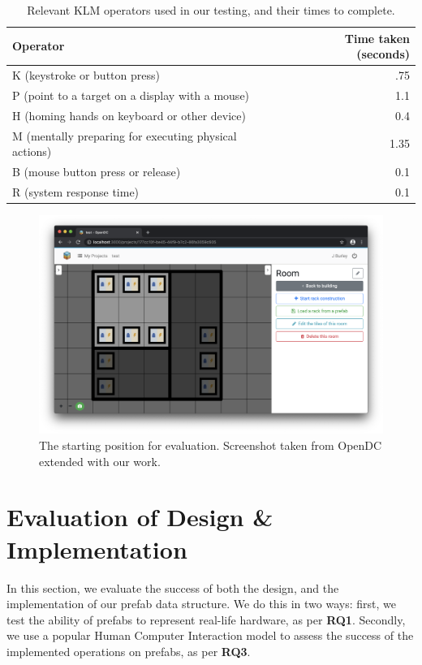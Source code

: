 \documentclass[11pt]{article}
\begin{document}
\begin{table}[]
\centering
	\begin{tabular}{lr}
	\toprule
	Operator                                              & Time taken (seconds) \\ \midrule
	K (keystroke or button press)                         & .75                  \\
	P (point to a target on a display with a mouse)       & 1.1                  \\
	H (homing hands on keyboard or other device)          & 0.4                  \\
	M (mentally preparing for executing physical actions) & 1.35                 \\
	B (mouse button press or release)                     & 0.1                  \\
	R (system response time)							  &	   0.1                  \\
	\bottomrule
	\end{tabular}
\caption[Relevant KLM operators used in our testing, and their times to complete]{Relevant KLM operators used in our testing, and their times to complete\cite{Newell1980}.}
\label{tab:3}
\end{table}


\begin{figure}[]
	\centering
	\includegraphics[width=\textwidth]{frontendstartingpoint.png}
	\caption[The starting position for evaluation]{The starting position for evaluation. Screenshot taken from OpenDC extended with our work.}
	\label{fig:evalstart}
\end{figure}

\section{Evaluation of Design \& Implementation} \label{sec:evaluation}
	In this section, we evaluate the success of both the design, and the implementation of our prefab data structure.
	We do this in two ways: first, we test the ability of prefabs to represent real-life hardware, as per \textbf{RQ1}.
	Secondly, we use a popular Human Computer Interaction model to assess the success of the implemented operations on prefabs, as per \textbf{RQ3}.
\end{document}
